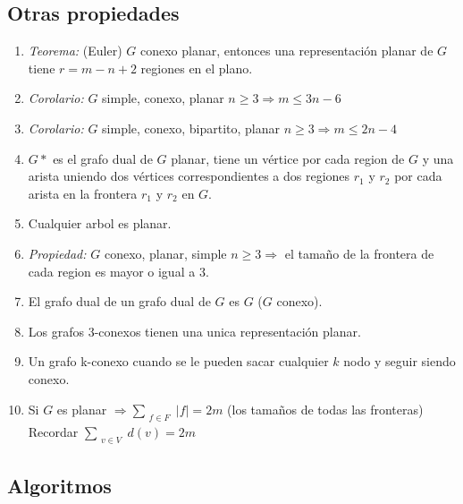 \subsection{Otras propiedades}
\begin{enumerate}
\item \textit{Teorema:} (Euler) $G$ conexo planar, entonces una representación planar de $G$ tiene $r=m-n+2$ regiones en el plano.
\item \textit{Corolario:} $G$ simple, conexo, planar $n \geq 3 \Rightarrow m \leq 3n-6$
\item \textit{Corolario:} $G$ simple, conexo, bipartito, planar $n \geq 3 \Rightarrow m \leq 2n-4$
\item $G*$ es el grafo dual de $G$ planar, tiene un vértice por cada region de $G$ y una arista uniendo dos vértices correspondientes a dos regiones $r_{1}$ y $r_{2}$ por cada arista en la frontera $r_{1}$ y $r_{2}$ en $G$.
\item Cualquier arbol es planar.
\item \textit{Propiedad:} $G$ conexo, planar, simple $n \geq 3 \Rightarrow$ el tamaño de la frontera de cada region es mayor o igual a $3$.
\item El grafo dual de un grafo dual de $G$ es $G$ ($G$ conexo).
\item Los grafos 3-conexos tienen una unica representación planar.
\item Un grafo k-conexo cuando se le pueden sacar cualquier $k$ nodo y seguir siendo conexo.
\item Si $G$ es planar $\Rightarrow \sum_{\substack{f \in F}}|f| = 2m$ (los tamaños de todas las fronteras) Recordar $\sum_{\substack{v \in V}}d(v) = 2m$
\end{enumerate}

\subsection{Algoritmos}
